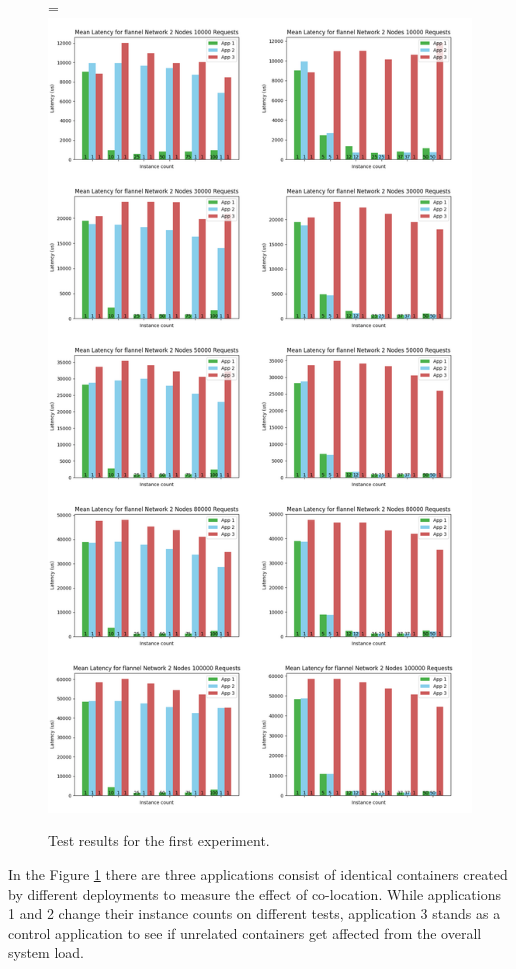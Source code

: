 \documentclass[12pt,oneandhalf,chaparabic,ceng,ms,eng,oneside,pntc]{gsufbe}
\makeatletter
\let\old@includegraphics\includegraphics
\renewcommand{\includegraphics}[2][,]{%
  \setbox9=\hbox{\old@includegraphics[#1]{#2}}%
  \ifdim\wd9>\textwidth
    \old@includegraphics[#1,width=\textwidth]{#2}%
  \else
    \old@includegraphics[#1]{#2}%
  \fi%
}
\makeatother
\begin{document}
\begin{figure}
\centering
\includegraphics[]{flannel.png}
\caption{Test results for the first experiment.}
\label{flannel}
\end{figure}

In the Figure \ref{flannel} there are three applications consist of identical containers
created by different deployments to measure the effect of co-location.
While applications 1 and 2 change their instance counts on different tests, application 3 stands as a
control application to see if unrelated containers get affected from the overall system load.
\end{document}
